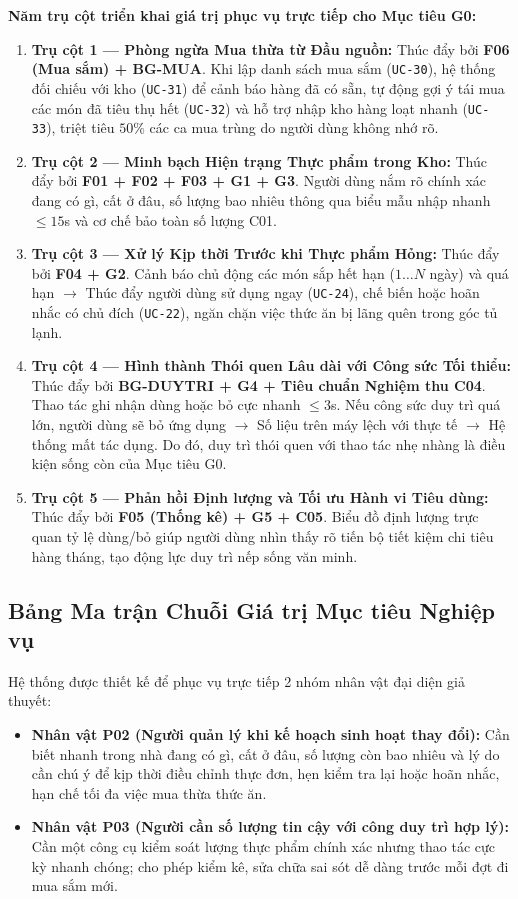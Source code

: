 \documentclass[10pt,a4paper]{article}
\begin{document}
\textbf{Năm trụ cột triển khai giá trị phục vụ trực tiếp cho Mục tiêu G0:}
\begin{enumerate}[itemsep=2pt]
    \item \textbf{Trụ cột 1 --- Phòng ngừa Mua thừa từ Đầu nguồn:} Thúc đẩy bởi \textbf{F06 (Mua sắm) + BG-MUA}. Khi lập danh sách mua sắm (\texttt{UC-30}), hệ thống đối chiếu với kho (\texttt{UC-31}) để cảnh báo hàng đã có sẵn, tự động gợi ý tái mua các món đã tiêu thụ hết (\texttt{UC-32}) và hỗ trợ nhập kho hàng loạt nhanh (\texttt{UC-33}), triệt tiêu $50\%$ các ca mua trùng do người dùng không nhớ rõ.
    \item \textbf{Trụ cột 2 --- Minh bạch Hiện trạng Thực phẩm trong Kho:} Thúc đẩy bởi \textbf{F01 + F02 + F03 + G1 + G3}. Người dùng nắm rõ chính xác đang có gì, cất ở đâu, số lượng bao nhiêu thông qua biểu mẫu nhập nhanh $\le 15$s và cơ chế bảo toàn số lượng C01.
    \item \textbf{Trụ cột 3 --- Xử lý Kịp thời Trước khi Thực phẩm Hỏng:} Thúc đẩy bởi \textbf{F04 + G2}. Cảnh báo chủ động các món sắp hết hạn ($1\dots N$ ngày) và quá hạn $\to$ Thúc đẩy người dùng sử dụng ngay (\texttt{UC-24}), chế biến hoặc hoãn nhắc có chủ đích (\texttt{UC-22}), ngăn chặn việc thức ăn bị lãng quên trong góc tủ lạnh.
    \item \textbf{Trụ cột 4 --- Hình thành Thói quen Lâu dài với Công sức Tối thiểu:} Thúc đẩy bởi \textbf{BG-DUYTRI + G4 + Tiêu chuẩn Nghiệm thu C04}. Thao tác ghi nhận dùng hoặc bỏ cực nhanh $\le 3$s. Nếu công sức duy trì quá lớn, người dùng sẽ bỏ ứng dụng $\to$ Số liệu trên máy lệch với thực tế $\to$ Hệ thống mất tác dụng. Do đó, duy trì thói quen với thao tác nhẹ nhàng là điều kiện sống còn của Mục tiêu G0.
    \item \textbf{Trụ cột 5 --- Phản hồi Định lượng và Tối ưu Hành vi Tiêu dùng:} Thúc đẩy bởi \textbf{F05 (Thống kê) + G5 + C05}. Biểu đồ định lượng trực quan tỷ lệ dùng/bỏ giúp người dùng nhìn thấy rõ tiến bộ tiết kiệm chi tiêu hàng tháng, tạo động lực duy trì nếp sống văn minh.
\end{enumerate}

\subsection{Bảng Ma trận Chuỗi Giá trị Mục tiêu Nghiệp vụ}
Hệ thống được thiết kế để phục vụ trực tiếp 2 nhóm nhân vật đại diện giả thuyết:
\begin{itemize}[itemsep=2pt]
    \item \textbf{Nhân vật P02 (Người quản lý khi kế hoạch sinh hoạt thay đổi):} Cần biết nhanh trong nhà đang có gì, cất ở đâu, số lượng còn bao nhiêu và lý do cần chú ý để kịp thời điều chỉnh thực đơn, hẹn kiểm tra lại hoặc hoãn nhắc, hạn chế tối đa việc mua thừa thức ăn.
    \item \textbf{Nhân vật P03 (Người cần số lượng tin cậy với công duy trì hợp lý):} Cần một công cụ kiểm soát lượng thực phẩm chính xác nhưng thao tác cực kỳ nhanh chóng; cho phép kiểm kê, sửa chữa sai sót dễ dàng trước mỗi đợt đi mua sắm mới.
\end{itemize}
\end{document}

